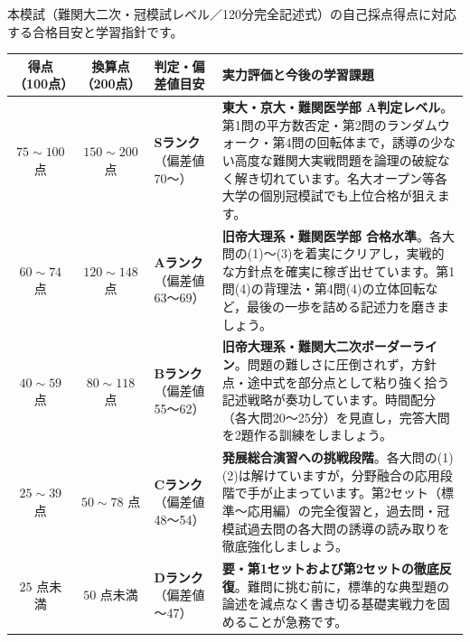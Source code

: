\par\vspace{1.0mm}\noindent
{\footnotesize 本模試（難関大二次・冠模試レベル／120分完全記述式）の自己採点得点に対応する合格目安と学習指針です。}
\par\vspace{1.5mm}
\begin{center}\footnotesize
\renewcommand{\arraystretch}{1.28}
\begin{tabular}{@{}cclp{26em}@{}}
\toprule
\textbf{得点（100点）} & \textbf{換算点（200点）} & \textbf{判定・偏差値目安} & \textbf{実力評価と今後の学習課題} \\
\midrule
$75 \sim 100$ 点 & $150 \sim 200$ 点 & \textbf{Sランク}（偏差値 70〜） & \textbf{東大・京大・難関医学部 A判定レベル}。第1問の平方数否定・第2問のランダムウォーク・第4問の回転体まで，誘導の少ない高度な難関大実戦問題を論理の破綻なく解き切れています。名大オープン等各大学の個別冠模試でも上位合格が狙えます。 \\
$60 \sim 74$ 点 & $120 \sim 148$ 点 & \textbf{Aランク}（偏差値 63〜69） & \textbf{旧帝大理系・難関医学部 合格水準}。各大問の(1)〜(3)を着実にクリアし，実戦的な方針点を確実に稼ぎ出せています。第1問(4)の背理法・第4問(4)の立体回転など，最後の一歩を詰める記述力を磨きましょう。 \\
$40 \sim 59$ 点 & $80 \sim 118$ 点 & \textbf{Bランク}（偏差値 55〜62） & \textbf{旧帝大理系・難関大二次ボーダーライン}。問題の難しさに圧倒されず，方針点・途中式を部分点として粘り強く拾う記述戦略が奏功しています。時間配分（各大問20〜25分）を見直し，完答大問を2題作る訓練をしましょう。 \\
$25 \sim 39$ 点 & $50 \sim 78$ 点 & \textbf{Cランク}（偏差値 48〜54） & \textbf{発展総合演習への挑戦段階}。各大問の(1)(2)は解けていますが，分野融合の応用段階で手が止まっています。第2セット（標準〜応用編）の完全復習と，過去問・冠模試過去問の各大問の誘導の読み取りを徹底強化しましょう。 \\
$25$ 点未満 & $50$ 点未満 & \textbf{Dランク}（偏差値 〜47） & \textbf{要・第1セットおよび第2セットの徹底反復}。難問に挑む前に，標準的な典型題の論述を減点なく書き切る基礎実戦力を固めることが急務です。 \\
\bottomrule
\end{tabular}
\end{center}


